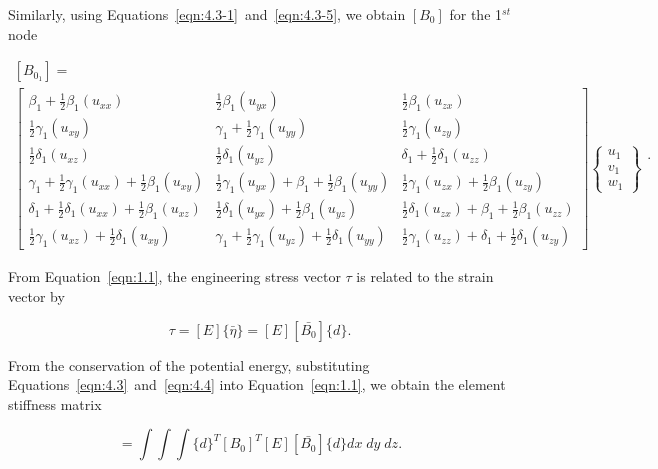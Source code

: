 \noindent Similarly, using Equations~\ref{eqn:4.3-1}~and~\ref{eqn:4.3-5}, we obtain $[B_{0}]$ for the 1$^{st}$ node

\begin{equation}
\begin{array}{l}
[B_{0_1}]
 = \\
\begin{bmatrix}
\beta_{1} + \frac{1}{2}\beta_{1}(u_{xx})  & \frac{1}{2}\beta_{1}(u_{yx}) & \frac{1}{2}\beta_{1}(u_{zx}) \\
\frac{1}{2}\gamma_{1}(u_{xy}) & \gamma_{1} + \frac{1}{2}\gamma_{1}(u_{yy}) & \frac{1}{2}\gamma_{1}(u_{zy}) \\
\frac{1}{2}\delta_{1}(u_{xz}) & \frac{1}{2}\delta_{1}(u_{yz}) & \delta_{1} + \frac{1}{2}\delta_{1}(u_{zz}) \\
\gamma_{1} + \frac{1}{2}\gamma_{1}(u_{xx}) + \frac{1}{2}\beta_{1}(u_{xy}) & \frac{1}{2}\gamma_{1}(u_{yx}) + \beta_{1} + \frac{1}{2}\beta_{1}(u_{yy}) & \frac{1}{2}\gamma_{1}(u_{zx}) + \frac{1}{2}\beta_{1}(u_{zy}) \\
\delta_{1} + \frac{1}{2}\delta_{1}(u_{xx}) + \frac{1}{2}\beta_{1}(u_{xz}) & \frac{1}{2}\delta_{1}(u_{yx}) + \frac{1}{2}\beta_{1}(u_{yz})  & \frac{1}{2}\delta_{1}(u_{zx}) + \beta_{1} + \frac{1}{2}\beta_{1}(u_{zz}) \\
\frac{1}{2}\gamma_{1}(u_{xz}) + \frac{1}{2}\delta_{1}(u_{xy}) & \gamma_{1} + \frac{1}{2}\gamma_{1}(u_{yz}) + \frac{1}{2}\delta_{1}(u_{yy}) & \frac{1}{2}\gamma_{1}(u_{zz}) + \delta_{1} + \frac{1}{2}\delta_{1}(u_{zy})
\end{bmatrix}
\begin{Bmatrix}
u_{1} \\
v_{1} \\
w_{1}
\end{Bmatrix}
\end{array}.
\label{eqn:4.3-7}
\end{equation}

\noindent From Equation~\ref{eqn:1.1}, the engineering stress vector $\tau$ is related to the strain vector by

\begin{equation}
\tau = [E]\{\bar{\eta}\} = [E][\bar{B_{0}}]\{d\}.
\label{eqn:4.4}
\end{equation}

\noindent From the conservation of the potential energy, substituting Equations~\ref{eqn:4.3}~and~\ref{eqn:4.4} into Equation~\ref{eqn:1.1}, we obtain the element stiffness matrix

\begin{equation}
[k(u)] = \int\int\int\{d\}^T[B_{0}]^T[E][\bar{B_{0}}]\{d\} dx \; dy \; dz.
\label{eqn:4.5}
\end{equation}

